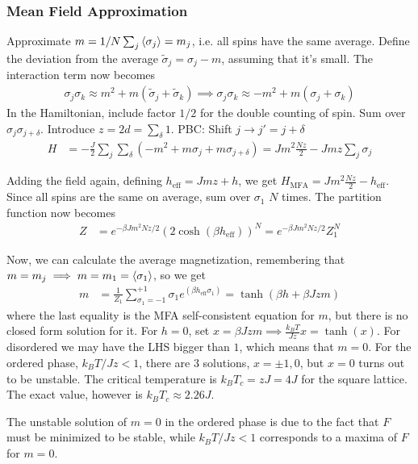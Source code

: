 \documentclass[a4paper, english, 12pt]{article}
\newcommand{\closed}[1]{\left( #1 \right)}
\begin{document}
\begin{multicols*}{2}
\subsubsection*{Mean Field Approximation}
Approximate $m=1/N \sum_j \expval{\sigma_j}=m_j$, i.e. all spins have the same average. Define the deviation from the average $\tilde{\sigma}_j=\sigma_j-m$, assuming that it's small. The interaction term now becomes 
\begin{align*}
    \sigma_j\sigma_k  \approx m^2 + m(\tilde{\sigma}_j + \tilde{\sigma}_k) \implies \sigma_j \sigma_k \approx -m^2 + m(\sigma_j + \sigma_k)
\end{align*}
In the Hamiltonian, include factor $1/2$ for the double counting of spin. Sum over $\sigma_j \sigma_{j+\delta}$. Introduce $z=2d=\sum_\delta 1$. PBC: Shift $j\to j'=j+\delta$ 
\begin{align*}
    H &= -\frac{J}{2}\sum_j \sum_\delta \closed{-m^2 + m\sigma_j + m\sigma_{j+\delta}} = Jm^2 \frac{Nz}{2} - J mz \sum_j \sigma_j
\end{align*}  

Adding the field again, defining $h_\mathrm{eff}=Jmz+h$, we get $H_\mathrm{MFA}=Jm^2 \frac{Nz}{2} - h_{\mathrm{eff}}$. Since all spins are the same on average, sum over $\sigma_1$ $N$ times. The partition function now becomes 
\begin{align*}
    Z &= e^{-\beta J m^2 Nz/2} \closed{2\cosh(\beta h_{\mathrm{eff}})}^N = e^{-\beta J m^2 Nz/2} Z_1^N
\end{align*}


Now, we can calculate the average magnetization, remembering that $m=m_j\implies m=m_1=\expval{\sigma_1}$, so we get 
\begin{align*}
    m &= \frac{1}{Z_1} \sum_{\sigma_1=-1}^{+1} \sigma_1 e^{(\beta h_{\mathrm{eff}}\sigma_1)} = \tanh(\beta h + \beta Jzm)
\end{align*}
where the last equality is the MFA self-consistent equation for $m$, but there is no closed form solution for it. For $h=0$, set $x=\beta J zm\implies \frac{k_B T}{Jz}x=\tanh(x)$. For disordered we may have the LHS bigger than $1$, which means that $m=0$. For the ordered phase, $k_B T/Jz < 1$, there are $3$ solutions, $x=\pm1,0$, but $x=0$ turns out to be unstable. The critical temperature is $k_B T_c=zJ=4J$ for the square lattice. The exact value, however is $k_B T_c\approx 2.26 J$.   

The unstable solution of $m=0$ in the ordered phase is due to the fact that $F$ must be minimized to be stable, while $k_B T/Jz < 1$ corresponds to a maxima of $F$ for $m=0$.  



\end{multicols*}
\end{document}
